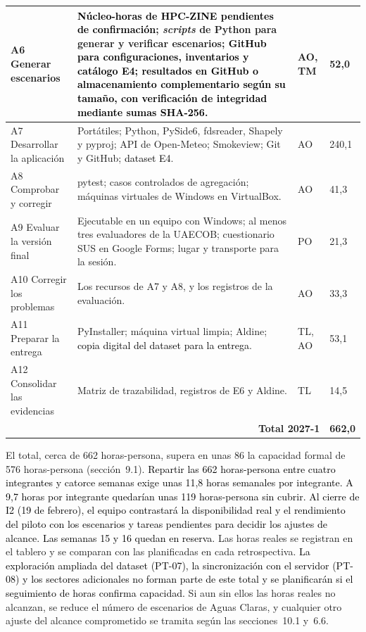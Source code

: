 \begin{longtable}{|p{}|p{}|p{}|p{}|}
\raggedright A6 Generar escenarios & \raggedright \textcolor{black}{Núcleo-horas de HPC-ZINE pendientes de confirmación}; \textit{scripts} de Python para generar y verificar escenarios; \textcolor{black}{GitHub para configuraciones, inventarios y catálogo E4; resultados en GitHub o almacenamiento complementario según su tamaño, con verificación de integridad mediante sumas SHA-256}. & AO, TM & 52,0\tabularnewline\hline

\raggedright A7 Desarrollar la aplicación & \raggedright Portátiles; Python, PySide6, fdsreader, Shapely y pyproj; API de Open-Meteo; Smokeview; Git y GitHub; \textcolor{black}{dataset E4}. & AO & 240,1\tabularnewline\hline

\raggedright A8 Comprobar y corregir & \raggedright pytest; casos controlados de agregación; máquinas virtuales de Windows en VirtualBox. & AO & 41,3\tabularnewline\hline

\raggedright A9 Evaluar la versión final & \raggedright Ejecutable en un equipo con Windows; al menos tres evaluadores de la UAECOB; cuestionario SUS en Google Forms; lugar y transporte para la sesión. & PO & 21,3\tabularnewline\hline

\raggedright A10 Corregir los problemas & \raggedright Los recursos de A7 y A8, y los registros de la evaluación. & AO & 33,3\tabularnewline\hline

\raggedright A11 Preparar la entrega & \raggedright PyInstaller; máquina virtual limpia; Aldine; \textcolor{black}{copia digital \textcolor{black}{del dataset} para la entrega}. & TL, AO & 53,1\tabularnewline\hline

\raggedright A12 Consolidar las evidencias & \raggedright Matriz de trazabilidad, registros de E6 y Aldine. & TL & 14,5\tabularnewline\hline

\multicolumn{3}{|r|}{\textbf{Total 2027-1}} & \textbf{662,0}\tabularnewline\hline
\end{longtable}
 
El total, cerca de 662 horas-persona, supera en unas 86 la capacidad formal de 576 horas-persona (sección~9.1). \textcolor{black}{Repartir las 662 horas-persona entre cuatro integrantes y catorce semanas exige unas 11,8 horas semanales por integrante. A 9,7 horas por integrante quedarían unas 119 horas-persona sin cubrir. Al cierre de I2 (19 de febrero), el equipo contrastará la disponibilidad real y el rendimiento del piloto con los escenarios y tareas pendientes para decidir los ajustes de alcance. Las semanas 15 y 16 quedan en reserva.} Las horas reales se registran en el tablero y se comparan con las planificadas en cada retrospectiva. \textcolor{black}{La exploración ampliada \textcolor{black}{del dataset} (PT-07), la sincronización con el servidor (PT-08) y los sectores adicionales no forman parte de este total y se planificarán si el seguimiento de horas confirma capacidad.} Si aun sin ellos las horas reales no alcanzan, se reduce el número de escenarios de Aguas Claras, y cualquier otro ajuste del alcance comprometido se tramita según las secciones~10.1 y~6.6.
